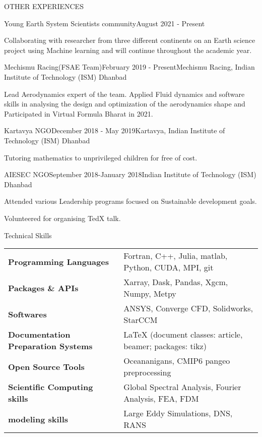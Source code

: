 \documentclass{resume} %
\begin{document}
\begin{rSection}{OTHER EXPERIENCES}
\begin{rSubsection}{Young Earth System Scientists community}{August 2021 - Present}{}
\item Collaborating with researcher from three different continents on an Earth science project using Machine learning and will continue throughout the academic year. 
\end{rSubsection}
\begin{rSubsection}{Mechismu Racing(FSAE Team)}{February 2019 - Present}{Mechismu Racing, Indian Institute of Technology (ISM) Dhanbad}
\item Lead Aerodynamics expert of the team. Applied Fluid dynamics and software skills in analysing the design and optimization of the aerodynamics shape and Participated in Virtual Formula Bharat in 2021.  
\end{rSubsection}

\begin{rSubsection}{Kartavya NGO}{December 2018 - May 2019}{Kartavya, Indian Institute of Technology (ISM) Dhanbad}
\item Tutoring mathematics to unprivileged children for free of cost. 
\end{rSubsection}

\begin{rSubsection}{AIESEC NGO}{September 2018-January 2018}{Indian Institute of Technology (ISM) Dhanbad}
\item Attended various Leadership programs focused on Sustainable development goals.
\item Volunteered for organising TedX talk. 
\end{rSubsection}

\end{rSection}


\begin{rSection}{Technical Skills}

\begin{tabular}{ @{} >{\bfseries}l @{\hspace{6ex}} l }
Programming Languages & Fortran, C++, Julia, matlab, Python, CUDA, MPI, git \\
Packages \& APIs & Xarray, Dask, Pandas, Xgcm, Numpy, Metpy \\
Softwares & ANSYS, Converge CFD, Solidworks, StarCCM \\
Documentation Preparation Systems &  LaTeX (document classes: article, beamer; packages: tikz)\\
Open Source Tools & Oceananigans, CMIP6 pangeo preprocessing\\
Scientific Computing skills & Global Spectral Analysis, Fourier Analysis, FEA, FDM\\
modeling skills & Large Eddy Simulations, DNS, RANS
\end{tabular}

\end{rSection}
\end{document}
